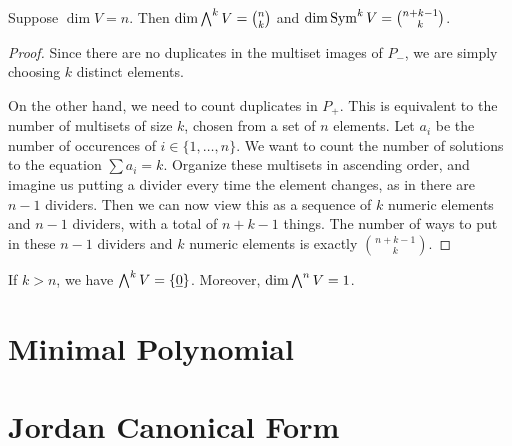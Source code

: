 \begin{corollary}
    Suppose \(\dim V = n\).
    Then \(\dim \operatorname{{\bigwedge}}^k V = \binom{n}{k}\) and \(\dim \operatorname{Sym}^k V = \binom{n+k-1}{k}\).
\end{corollary}
\begin{proof}
    Since there are no duplicates in the multiset images of \(P_-\),
    we are simply choosing \(k\) distinct elements.

    On the other hand, we need to count duplicates in \(P_+\).
    This is equivalent to the number of multisets of size \(k\),
    chosen from a set of \(n\) elements.
    Let \(a_i\) be the number of occurences of \(i \in \{1,\hdots,n\}\).
    We want to count the number of solutions to the equation \(\sum a_i = k\).
    Organize these multisets in ascending order,
    and imagine us putting a divider every time the element changes,
    as in there are \(n-1\) dividers.
    Then we can now view this as a sequence of \(k\) numeric elements and \(n-1\) dividers,
    with a total of \(n+k-1\) things.
    The number of ways to put in these \(n-1\) dividers and \(k\) numeric elements
    is exactly \(\binom{n+k-1}{k}\).
\end{proof}
\begin{remark}
    If \(k > n\), we have \(\operatorname{{\bigwedge}}^k V = \{\underline{0}\}\).
    Moreover, \(\dim \operatorname{{\bigwedge}}^n V = 1\).
\end{remark}


\section{Minimal Polynomial}


\section{Jordan Canonical Form}
